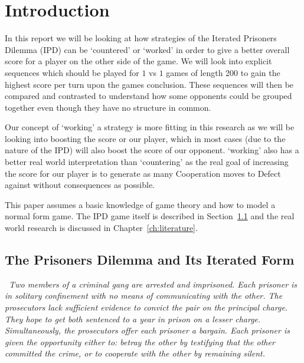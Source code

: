
\chapter{Introduction}\label{ch:intro}
In this report we will be looking at how strategies of the Iterated Prisoners Dilemma (IPD) can be `countered' or `worked' in order to give a better overall score for a player on the other side of the game.
We will look into explicit sequences which should be played for $1$ vs $1$ games of length 200 to gain the highest score per turn upon the games conclusion.
These sequences will then be compared and contrasted to understand how some opponents could be grouped together even though they have no structure in common.

Our concept of `working' a strategy is more fitting in this research as we will be looking into boosting the score or our player, which in most cases (due to the nature of the IPD) will also boost the score of our opponent.
`working' also has a better real world interpretation than `countering' as the real goal of increasing the score for our player is to generate as many Cooperation moves to Defect against without consequences as possible.

This paper assumes a basic knowledge of game theory and how to model a normal form game.
The IPD game itself is described in Section~\ref{sec:iteratedPrisonersDilemma} and the real world research is discussed in Chapter~\ref{ch:literature}.


\section{The Prisoners Dilemma and Its Iterated Form}\label{sec:iteratedPrisonersDilemma}
\begin{center}
    \itshape~Two members of a criminal gang are arrested and imprisoned.
    Each prisoner is in solitary confinement with no means of communicating with the other.
    The prosecutors lack sufficient evidence to convict the pair on the principal charge.
    They hope to get both sentenced to a year in prison on a lesser charge. Simultaneously, the prosecutors offer each prisoner a bargain.
    Each prisoner is given the opportunity either to: betray the other by testifying that the other committed the crime, or to cooperate with the other by remaining silent.
\end{center}

